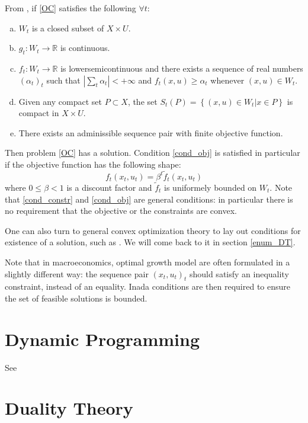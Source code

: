 \documentclass[12pt]{article}
\begin{document}
From \cite{keerthiExistenceTheoremDiscretetime1985}, if \eqref{OC} satisfies the following $\forall t$:
\begin{enumerate}[(a)]
  \item $W_t$ is a closed subset of $X \times U$. 
  \item \label{cond_constr} $g_t: W_t \to \mathbb{R}$ is continuous.
  \item \label{cond_obj} $f_t: W_t \to \mathbb{R}$ is lowersemicontinuous and there exists a sequence of real numbers $(\alpha_t)_t$ such that $| \sum_t \alpha_t | < +\infty$ and $f_t(x,u) \geq \alpha_t$ whenever $(x,u) \in W_t$.
  \item Given any compact set $P \subset X$, the set $S_t(P) = \left\{(x,u) \in W_t | x \in P\right\}$ is compact in $X \times U$.
  \item There exists an adminissible sequence pair with finite objective function. 
\end{enumerate}
Then problem \eqref{OC} has a solution. Condition \ref{cond_obj} is satisfied in particular if the objective function has the following shape:
\begin{equation} \label{discount} \tag{DO}
  f_t(x_t, u_t) = \beta^t \tilde{f}_t(x_t, u_t)
\end{equation}
where $0 \leq \beta  < 1$ is a discount factor and $\tilde{f}_t$ is uniformely bounded on $W_t$. Note that \ref{cond_constr} and \ref{cond_obj} are general conditions: in particular there is no requirement that the objective or the constraints are convex.

One can also turn to general convex optimization theory to lay out conditions for existence of a solution, such as \cite{combettesConvexAnalysisMonotone2017}. We will come back to it in section \ref{enum_DT}.

\bigskip

Note that in macroeconomics, optimal growth model are often formulated in a slightly different way: the sequence pair $(x_t,u_t)_t$ should satisfy an inequality constraint, instead of an equality. Inada conditions are then required to ensure the set of feasible solutions is bounded. 

\section{Dynamic Programming}

See \cite{bertsekasDynamicProgrammingOptimal1995}

\section{Duality Theory}
\end{document}
